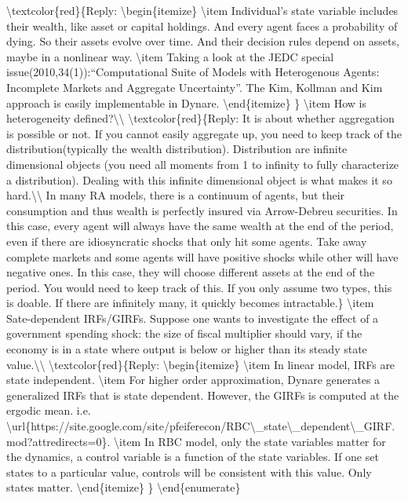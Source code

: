 \documentclass[10pt,math=newtx,citestyle=gb7714-2015,bibstyle=gb7714-2015]{elegantbook}
\begin{document}
	\textbackslash{}textcolor\{red\}\{Reply:
	\textbackslash{}begin\{itemize\}
	\textbackslash{}item Individual's state variable includes their wealth, like asset or capital holdings. And every agent faces a probability of dying. So their assets evolve over time. And their decision rules depend on assets, maybe in a nonlinear way.
	\textbackslash{}item Taking a look at the JEDC special issue(2010,34(1)):``Computational Suite of Models with Heterogenous Agents: Incomplete Markets and Aggregate Uncertainty''. The Kim, Kollman and Kim approach is easily implementable in Dynare.
	\textbackslash{}end\{itemize\}
	\}
	\textbackslash{}item How is heterogeneity defined?\textbackslash{}\textbackslash{}
	\textbackslash{}textcolor\{red\}\{Reply: It is about whether aggregation is possible or not. If you cannot easily aggregate up, you need to keep track of the distribution(typically the wealth distribution). Distribution are infinite dimensional objects (you need all moments from 1 to infinity to fully characterize a distribution). Dealing with this infinite dimensional object is what makes it so hard.\textbackslash{}\textbackslash{}
	In many RA models, there is a continuum of agents, but their consumption and thus wealth is perfectly insured via Arrow-Debreu securities. In this case, every agent will always have the same wealth at the end of the period, even if there are idiosyncratic shocks that only hit some agents. Take away complete markets and some agents will have positive shocks while other will have negative ones. In this case, they will choose different assets at the end of the period. You would need to keep track of this. If you only assume two types, this is doable. If there are infinitely many, it quickly becomes intractable.\}
	\textbackslash{}item Sate-dependent IRFs/GIRFs. Suppose one wants to investigate the effect of a government spending shock: the size of fiscal multiplier should vary, if the economy is in a state where output is below or higher than its steady state value.\textbackslash{}\textbackslash{}
	\textbackslash{}textcolor\{red\}\{Reply:
	\textbackslash{}begin\{itemize\}
	\textbackslash{}item In linear model, IRFs are state independent.
	\textbackslash{}item For higher order approximation, Dynare generates a generalized IRFs that is state dependent. However, the GIRFs is computed at the ergodic mean. i.e. \textbackslash{}url\{https://site.google.com/site/pfeiferecon/RBC\textbackslash{}\_state\textbackslash{}\_dependent\textbackslash{}\_GIRF.mod?attredirects=0\}.
	\textbackslash{}item In RBC model, only the state variables matter for the dynamics, a control variable is a function of the state variables. If one set states to a particular value, controls will be consistent with this value. Only states matter.
	\textbackslash{}end\{itemize\}
	\}
	\textbackslash{}end\{enumerate\}
	
\end{document}
